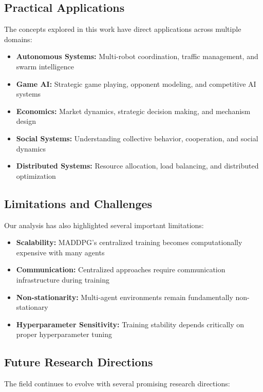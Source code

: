 \documentclass[conference]{IEEEtran}
\begin{document}
{{\subsection{Practical Applications}

The concepts explored in this work have direct applications across multiple domains:

\begin{itemize}
    \item \textbf{Autonomous Systems:} Multi-robot coordination, traffic management, and swarm intelligence
    \item \textbf{Game AI:} Strategic game playing, opponent modeling, and competitive AI systems
    \item \textbf{Economics:} Market dynamics, strategic decision making, and mechanism design
    \item \textbf{Social Systems:} Understanding collective behavior, cooperation, and social dynamics
    \item \textbf{Distributed Systems:} Resource allocation, load balancing, and distributed optimization
\end{itemize}

\subsection{Limitations and Challenges}

Our analysis has also highlighted several important limitations:

\begin{itemize}
    \item \textbf{Scalability:} MADDPG's centralized training becomes computationally expensive with many agents
    \item \textbf{Communication:} Centralized approaches require communication infrastructure during training
    \item \textbf{Non-stationarity:} Multi-agent environments remain fundamentally non-stationary
    \item \textbf{Hyperparameter Sensitivity:} Training stability depends critically on proper hyperparameter tuning
\end{itemize}

\subsection{Future Research Directions}

The field continues to evolve with several promising research directions:

}}
\end{document}

